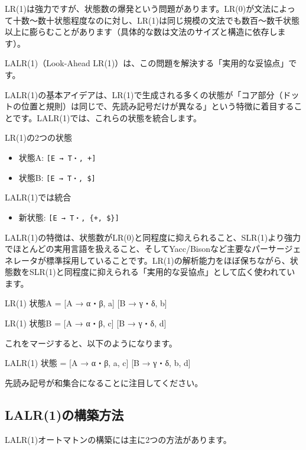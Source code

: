 LR(1)は強力ですが、状態数の爆発という問題があります。LR(0)が文法によって十数〜数十状態程度なのに対し、LR(1)は同じ規模の文法でも数百〜数千状態以上に膨らむことがあります（具体的な数は文法のサイズと構造に依存します）。

LALR(1)（Look-Ahead
LR(1)）は、この問題を解決する「実用的な妥協点」です。

LALR(1)の基本アイデアは、LR(1)で生成される多くの状態が「コア部分（ドットの位置と規則）は同じで、先読み記号だけが異なる」という特徴に着目することです。LALR(1)では、これらの状態を統合します。

LR(1)の2つの状態

\begin{itemize}
\item
  状態A: \texttt{{[}E → T・, +{]}}
\item
  状態B: \texttt{{[}E → T・, \${]}}
\end{itemize}

LALR(1)では統合

\begin{itemize}
\item
  新状態: \texttt{{[}E → T・, \{+, \$\}{]}}
\end{itemize}

LALR(1)の特徴は、状態数がLR(0)と同程度に抑えられること、SLR(1)より強力でほとんどの実用言語を扱えること、そしてYacc/Bisonなど主要なパーサージェネレータが標準採用していることです。LR(1)の解析能力をほぼ保ちながら、状態数をSLR(1)と同程度に抑えられる「実用的な妥協点」として広く使われています。

\begin{codescreen}{}
LR(1) 状態A = {
    [A → α・β, a]
    [B → γ・δ, b]
}

LR(1) 状態B = {
    [A → α・β, c]
    [B → γ・δ, d]
}
\end{codescreen}

これをマージすると、以下のようになります。

\begin{codescreen}{}
LALR(1) 状態 = {
    [A → α・β, {a, c}]
    [B → γ・δ, {b, d}]
}
\end{codescreen}

先読み記号が和集合になることに注目してください。

\subsection{LALR(1)の構築方法}

LALR(1)オートマトンの構築には主に2つの方法があります。


